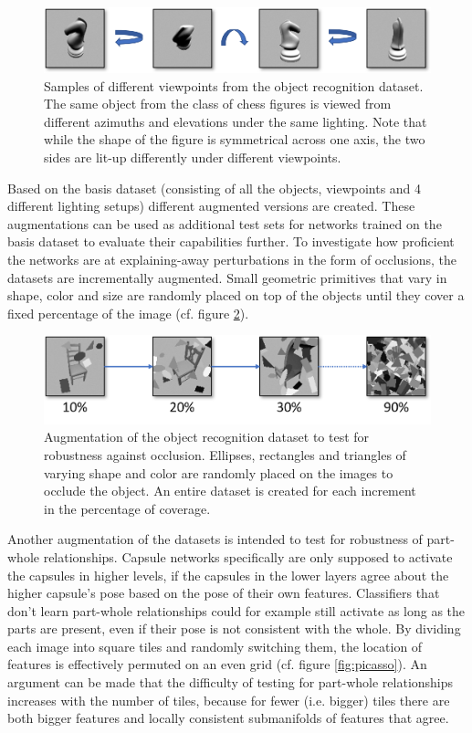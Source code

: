 \begin{figure}[H]
    \centering
    \includegraphics[width=\textwidth]{figures/viewpoint.png}
\caption[Samples of different viewpoints from the object recognition dataset.]{Samples of different viewpoints from the object recognition dataset. The same object from the class of chess figures is viewed from different azimuths and elevations under the same lighting. Note that while the shape of the figure is symmetrical across one axis, the two sides are lit-up differently under different viewpoints.}\label{fig:viewpoint}
\end{figure}\noindent
Based on the basis dataset (consisting of all the objects, viewpoints and 4 different lighting setups) different augmented versions are created. These augmentations can be used as additional test sets for networks trained on the basis dataset to evaluate their capabilities further. To investigate how proficient the networks are at explaining-away perturbations in the form of occlusions, the datasets are incrementally augmented. Small geometric primitives that vary in shape, color and size are randomly placed on top of the objects until they cover a fixed percentage of the image (cf. figure \ref{fig:occlusion}).
\begin{figure}[H]
    \centering
    \includegraphics[width=\textwidth]{figures/occlusion.png}
\caption[Augmentation of the object recognition dataset to test for robustness against occlusion]{Augmentation of the object recognition dataset to test for robustness against occlusion. Ellipses, rectangles and triangles of varying shape and color are randomly placed on the images to occlude the object. An entire dataset is created for each increment in the percentage of coverage.}\label{fig:occlusion}
\end{figure}\newpage\noindent
Another augmentation of the datasets is intended to test for robustness of part-whole relationships. Capsule networks specifically are only supposed to activate the capsules in higher levels, if the capsules in the lower layers agree about the higher capsule's pose based on the pose of their own features. Classifiers that don't learn part-whole relationships could for example still activate as long as the parts are present, even if their pose is not consistent with the whole. By dividing each image into square tiles and randomly switching them, the location of features is effectively permuted on an even grid (cf. figure \ref{fig:picasso}). An argument can be made that the difficulty of testing for part-whole relationships increases with the number of tiles, because for fewer (i.e. bigger) tiles there are both bigger features and locally consistent submanifolds of features that agree.
